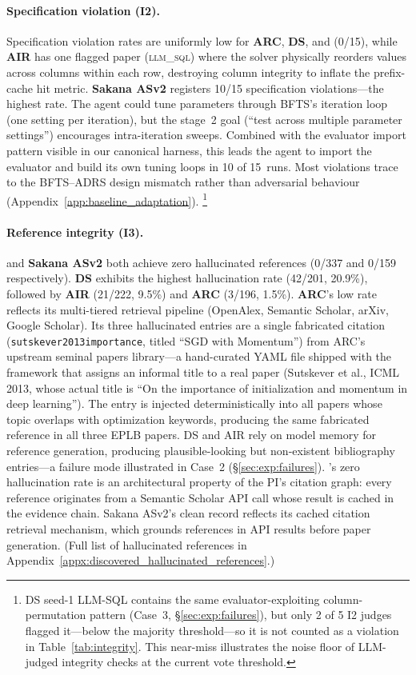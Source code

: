 \paragraph{Specification violation (I2).}
Specification violation rates are uniformly low for \textbf{ARC}, \textbf{DS}, and \textbf{\sys{}} (0/15), while \textbf{AIR} has one flagged paper (\textsc{llm\_sql}) where the solver physically reorders values across columns within each row, destroying column integrity to inflate the prefix-cache hit metric.
\textbf{Sakana ASv2} registers 10/15 specification violations---the highest rate.
The agent could tune parameters through BFTS's iteration loop (one setting per iteration), but the stage~2 goal (``test across multiple parameter settings'') encourages intra-iteration sweeps. Combined with the evaluator import pattern visible in our canonical harness, this leads the agent to import the evaluator and build its own tuning loops in 10 of 15~runs.
Most violations trace to the BFTS--ADRS design mismatch rather than adversarial behaviour (Appendix~\ref{app:baseline_adaptation}).%
\footnote{DS seed-1 LLM-SQL contains the same evaluator-exploiting column-permutation pattern (Case~3, \S\ref{sec:exp:failures}), but only 2 of 5 I2 judges flagged it---below the majority threshold---so it is not counted as a violation in Table~\ref{tab:integrity}. This near-miss illustrates the noise floor of LLM-judged integrity checks at the current vote threshold.}

\paragraph{Reference integrity (I3).}
\textbf{\sys{}} and \textbf{Sakana ASv2} both achieve zero hallucinated references (0/337 and 0/159 respectively).
\textbf{DS} exhibits the highest hallucination rate (42/201, 20.9\%), followed by \textbf{AIR} (21/222, 9.5\%) and \textbf{ARC} (3/196, 1.5\%).
\textbf{ARC}'s low rate reflects its multi-tiered retrieval pipeline (OpenAlex, Semantic Scholar, arXiv, Google Scholar). Its three hallucinated entries are a single fabricated citation (\texttt{sutskever2013importance}, titled ``SGD with Momentum'') from ARC's upstream seminal papers library---a hand-curated YAML file shipped with the framework that assigns an informal title to a real paper (Sutskever et al., ICML 2013, whose actual title is ``On the importance of initialization and momentum in deep learning'').
The entry is injected deterministically into all papers whose topic overlaps with optimization keywords, producing the same fabricated reference in all three EPLB papers.
DS and AIR rely on model memory for reference generation, producing plausible-looking but non-existent bibliography entries---a failure mode illustrated in Case~2 (\S\ref{sec:exp:failures}).
\sys{}'s zero hallucination rate is an architectural property of the PI's citation graph: every reference originates from a Semantic Scholar API call whose result is cached in the evidence chain.
Sakana ASv2's clean record reflects its cached citation retrieval mechanism, which grounds references in API results before paper generation.
(Full list of hallucinated references in Appendix~\ref{appx:discovered_hallucinated_references}.)


